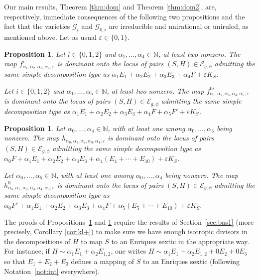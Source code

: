 \documentclass[11pt]{amsart}
\newtheorem{proposition}[thm]{Proposition}
\theoremstyle{definition}
\def\E{{\mathcal E}}
\begin{document}
Our main results, Theorem \ref{thm:dom} and Theorem \ref{thm:dom2}, are, respectively, immediate consequences of the following two propositions \color{black} and the fact that the varieties  $\mathcal G_i$ and $\mathcal G_{0,i}$ are irreducible and unirational or uniruled, as mentioned above. \color{black}  Let as usual $\varepsilon\in\{0,1\}$. 

\begin{proposition} \label{prop:dom} 
Let $i \in \{0,1,2\}$ and $\alpha_1,\ldots,\alpha_4\in \mathbb{N}$, at
least two nonzero.
  The map $f^i_{\alpha_1,\alpha_2,\alpha_3, \alpha_4; \varepsilon }$ 
is dominant onto the locus of pairs $(S,H) \in \E_{g,\phi}$ admitting
the same simple decomposition type as 
$\alpha_1E_1+\alpha_2E_2+\alpha_3E_3+\alpha_4F+\varepsilon K_S$.

Let $i \in \{0,1,2\}$ and $\alpha_1,\ldots,\alpha_5\in \mathbb{N}$, at
least two nonzero.
The map $f^{0i}_{\alpha_1,\alpha_2,\alpha_3, \alpha_4,\alpha_5; \varepsilon }$ 
is dominant onto the locus of pairs $(S,H) \in \E_{g,\phi}$  admitting the same  simple decomposition type as $\alpha_1E_1+\alpha_2E_2+\alpha_3E_3+\alpha_4F+\alpha_5F'+\varepsilon K_S$.
\end{proposition}
 
\begin{proposition} \label{prop:dom2} 
Let $\alpha_0,\ldots, \alpha_4 \in \mathbb{N}$, with at least one among 
$\alpha_0,\ldots,\alpha_3$  being  nonzero.
  The map $h_{\alpha_0,\alpha_1,\alpha_2,\alpha_3, \alpha_4; \varepsilon }$
is dominant onto the locus of pairs $(S,H) \in \E_{g,\phi}$ admitting
the same simple decomposition type as
$\alpha_0F+\alpha_1E_1+\alpha_2E_2+\alpha_3E_3+\alpha_4(E_4+\cdots+E_{10})+\varepsilon K_S$.


Let $\alpha_0,\ldots, \alpha_5 \in \mathbb{N}$, with at least one among 
$\alpha_0,\ldots,\alpha_4$  being  nonzero.
The map $h^{0}_{\alpha_0,\alpha_1,\alpha_2,\alpha_3, \alpha_4,\alpha_5; \varepsilon }$ 
is dominant onto the locus of pairs $(S,H) \in \E_{g,\phi}$  admitting the same  simple decomposition type as $\alpha_0F'+\alpha_1E_1+\alpha_2E_2+\alpha_3E_3+\alpha_4F+\alpha_5(E_5+\cdots+E_{10})+\varepsilon K_S$.
\end{proposition}

The proofs of Propositions~\ref{prop:dom} and \ref{prop:dom2} require
the results of Section~\ref{sec:bas1}  (more precisely, Corollary \ref{cor:kl+})  to make sure we have enough
isotropic divisors in the decompositions of $H$ to map $S$ to an
Enriques sextic in the appropriate way.
For instance, if
$H  \sim  \alpha_1 E_1+\alpha_2 E_{1,2}$, one 
writes $H  \sim  \alpha_1 E_1+\alpha_2 E_{1,2}+0E_2+0E_3$ so that
$E_1+E_2+E_3$ defines a mapping of $S$ to an Enriques sextic
(following Notation~\ref{not:int} everywhere).
\end{document}
